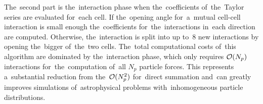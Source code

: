 The~second part is the~interaction phase when the~coefficients of~the~Taylor series are evaluated for~each cell. If the~opening angle for~a~mutual cell-cell interaction is small enough the~coefficients for~the~interactions in~each direction are computed.  Otherwise, the~interaction is split into up to~8 new interactions by opening the~bigger of~the~two cells. The~total computational
costs of~this algorithm are dominated by the~interaction phase, which only requires $\mathcal{O}(N_p)$ interactions for~the~computation of~all $N_p$ particle forces. This represents a~substantial reduction from the~$\mathcal{O}(N_p^2)$ for~direct summation and~can greatly improves simulations of~astrophysical problems with~inhomogeneous particle distributions.
